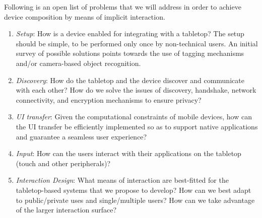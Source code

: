 Following is an open list of problems that we will address in order to achieve device composition by means of implicit interaction.
\begin{enumerate}
\item{\emph{Setup}: How is a device enabled for integrating with a tabletop?
The setup should be simple, to be performed only once by non-technical users.
An initial survey of possible solutions points towards the use of tagging mechanisms and/or camera-based object recognition.}
\item{\emph{Discovery}: How do the tabletop and the device discover and communicate with each other?
How do we solve the issues of discovery, handshake, network connectivity, and encryption mechanisms to ensure privacy?}
\item{\emph{UI transfer}: Given the computational constraints of mobile devices, how can the UI transfer be efficiently implemented so as to support native applications and guarantee a seamless user experience?}
\item{\emph{Input}: How can the users interact with their applications on the tabletop (touch and other peripherals)?}
\item{\emph{Interaction Design}: What means of interaction are best-fitted for the tabletop-based systems that we propose to develop?
How can we best adapt to public/private uses and single/multiple users?
How can we take advantage of the larger interaction surface?}
\end{enumerate}

